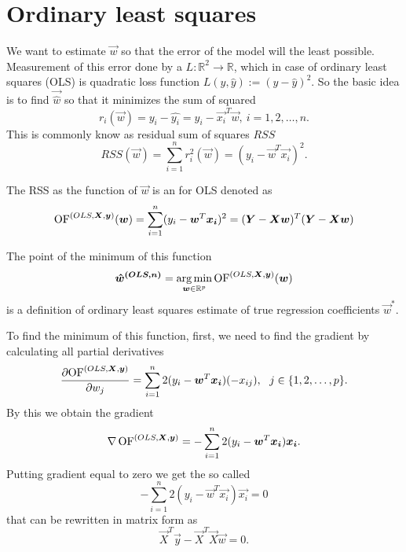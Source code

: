 \section{Ordinary least squares}
We want to estimate $\vec{w}$ so that the error of the model will the least possible. Measurement of this error done by a  
$L : \mathbb{R}^2 \rightarrow  \mathbb{R}$,
which in case of ordinary least squares (OLS) is quadratic loss function $L(y, \hat{y}) := (y - \hat{y})^2$. 
So the basic idea is to find $\vec{\hat{w}}$ so that it minimizes the sum of squared 
\begin{equation}
    r_i(\vec{w}) =y_i - \hat{y_i} = y_i - \vec{x_i}^T\vec{w} ,\ i = 1,2,\ldots ,n.
\end{equation}
This is commonly know as residual sum of squares $RSS$
\begin{equation}
    RSS(\vec{w}) = \sum\limits_{i=1}^n r_i^2(\vec{w}) = (y_i - \vec{w}^T\vec{x_i})^2.
\end{equation}
\begin{definition} The RSS as the function of $\vec{w}$ is an  for OLS denoted as
    \begin{equation}
        \operatorname{OF}^{(OLS,\boldsymbol{X}, \boldsymbol{y})}(\boldsymbol{w}) = \sum\limits_{i=1}^n (y_i - \boldsymbol{w}^T\boldsymbol{x_i})^2 = (\boldsymbol{Y} - \boldsymbol{X}\boldsymbol{w})^T(\boldsymbol{Y} - \boldsymbol{X}\boldsymbol{w})
    \end{equation}
\end{definition}
The point of the minimum of this function 
\begin{equation}
\boldsymbol{\hat{w}^{(OLS, n)}}  = \operatorname*{arg\,min}_{\boldsymbol{w} \in \mathbb{R}^p} \operatorname{OF}^{(OLS,\boldsymbol{X}, \boldsymbol{y})}(\boldsymbol{w})
\end{equation}
is a definition of ordinary least squares estimate of true regression coefficients $\vec{w}^*$.

To find the minimum of this function, first, we need to find the gradient by calculating all partial derivatives
\begin{equation}
    \frac{\partial {\operatorname{OF}^{(OLS,\boldsymbol{X}, \boldsymbol{y})}} }{\partial w_j} = \sum\limits_{i=1}^n 2(y_i - \boldsymbol{w}^T\boldsymbol{x_i})(-x_{ij}) \\, \ \ j \in \{{1,2,\ldots,p\}}. 
\end{equation}
By this we obtain the gradient 
\begin{equation}
    \nabla \operatorname{OF}^{(OLS,\boldsymbol{X}, \boldsymbol{y})} = -\sum\limits_{i=1}^n 2(y_i - \boldsymbol{w}^T\boldsymbol{x_i})\boldsymbol{x_i}. 
\end{equation}
Putting gradient equal to zero we get the so called 
\begin{equation}
    -\sum\limits_{i=1}^n 2(y_i - \vec{w}^T\vec{x_i})\vec{x_i} = 0 
\end{equation}
that can be rewritten in matrix form as 
\begin{equation}    \label{equation:zerogradient}
    \vec{X}^T\vec{y} - \vec{X}^T\vec{X}\vec{w} = 0.
\end{equation}

